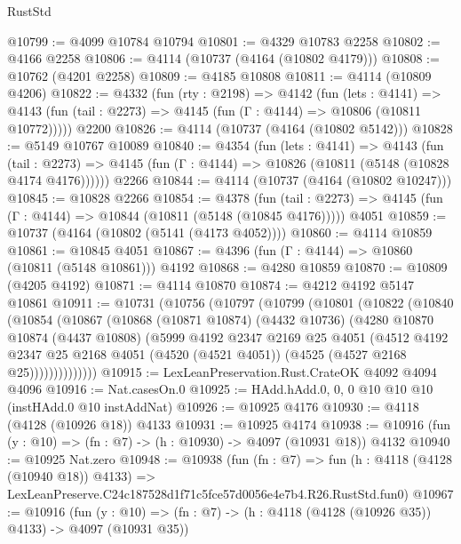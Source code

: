 \begin{lexlean}{RustStd}
\begin{coremodule}
@10799 := @4099 @10784 @10794
@10801 := @4329 @10783 @2258
@10802 := @4166 @2258
@10806 := @4114 (@10737 (@4164 (@10802 @4179)))
@10808 := @10762 (@4201 @2258)
@10809 := @4185 @10808
@10811 := @4114 (@10809 @4206)
@10822 := @4332
    (fun (rty : @2198) =>
    @4142
      (fun (lets : @4141) =>
      @4143 (fun (tail : @2273) => @4145 (fun (Γ : @4144) => @10806 (@10811 @10772)))))
    @2200
@10826 := @4114 (@10737 (@4164 (@10802 @5142)))
@10828 := @5149 @10767 @10089
@10840 := @4354
    (fun (lets : @4141) =>
    @4143
      (fun (tail : @2273) =>
      @4145 (fun (Γ : @4144) => @10826 (@10811 (@5148 (@10828 @4174 @4176))))))
    @2266
@10844 := @4114 (@10737 (@4164 (@10802 @10247)))
@10845 := @10828 @2266
@10854 := @4378
    (fun (tail : @2273) => @4145 (fun (Γ : @4144) => @10844 (@10811 (@5148 (@10845 @4176)))))
    @4051
@10859 := @10737 (@4164 (@10802 (@5141 (@4173 @4052))))
@10860 := @4114 @10859
@10861 := @10845 @4051
@10867 := @4396 (fun (Γ : @4144) => @10860 (@10811 (@5148 @10861))) @4192
@10868 := @4280 @10859
@10870 := @10809 (@4205 @4192)
@10871 := @4114 @10870
@10874 := @4212 @4192 @5147 @10861
@10911 := @10731
    (@10756
      (@10797
        (@10799
          (@10801
            (@10822
              (@10840
                (@10854
                  (@10867
                    (@10868
                      (@10871 @10874)
                      (@4432 @10736)
                      (@4280
                        @10870
                        @10874
                        (@4437 @10808)
                        (@5999
                          @4192
                          @2347
                          @2169
                          @25
                          @4051
                          (@4512
                            @4192
                            @2347
                            @25
                            @2168
                            @4051
                            (@4520 (@4521 @4051))
                            (@4525 (@4527 @2168 @25))))))))))))))
@10915 := LexLeanPreservation.Rust.CrateOK @4092 @4094 @4096
@10916 := Nat.casesOn.{0}
@10925 := HAdd.hAdd.{0, 0, 0} @10 @10 @10 (instHAdd.{0} @10 instAddNat)
@10926 := @10925 @4176
@10930 := @4118 (@4128 (@10926 @18)) @4133
@10931 := @10925 @4174
@10938 := @10916 (fun (y : @10) => (fn : @7) -> (h : @10930) -> @4097 (@10931 @18)) @4132
@10940 := @10925 Nat.zero
@10948 := @10938
    (fun (fn : @7) =>
    fun (h : @4118 (@4128 (@10940 @18)) @4133) =>
    LexLeanPreserve.C24c187528d1f71c5fce57d0056e4e7b4.R26.RustStd.fun0)
@10967 := @10916
    (fun (y : @10) => (fn : @7) -> (h : @4118 (@4128 (@10926 @35)) @4133) -> @4097 (@10931 @35))

\end{coremodule}
\end{lexlean}
